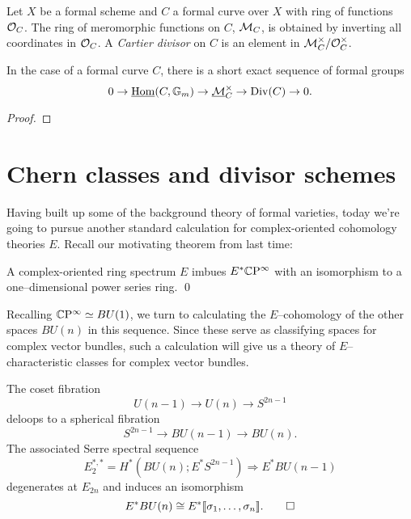 \begin{definition}
Let $X$ be a formal scheme and $C$ a formal curve over $X$ with ring of functions $\mathcal{O}_C$.  The ring of meromorphic functions on $C$, $\mathcal{M}_C$, is obtained by inverting all coordinates in $\mathcal{O}_C$.  A \textit{Cartier divisor} on $C$ is an element in $\mathcal{M}_C^\times / \mathcal{O}_C^\times$.
\end{definition}

\begin{lemma}
In the case of a formal curve $C$, there is a short exact sequence of formal groups \[0 \to \underline{\operatorname{Hom}}(C, \mathbb G_m) \to \underline{\mathcal{M}}_C^\times \to \operatorname{Div}(C) \to 0.\]
\end{lemma}
\begin{proof}
\end{proof}









\section{Chern classes and divisor schemes}

Having built up some of the background theory of formal varieties, today we're going to pursue another standard calculation for complex-oriented cohomology theories $E$.  Recall our motivating theorem from last time:
\begin{corollary}
A complex-oriented ring spectrum $E$ imbues $E^* \mathbb{C}\mathrm P^\infty$ with an isomorphism to a one--dimensional power series ring. \qed
\end{corollary}

\noindent Recalling $\mathbb{C}\mathrm P^\infty \simeq BU(1)$, we turn to calculating the $E$--cohomology of the other spaces $BU(n)$ in this sequence.  Since these serve as classifying spaces for complex vector bundles, such a calculation will give us a theory of $E$--characteristic classes for complex vector bundles.

\begin{lemma}\label{ECohomologyOfBUn}
The coset fibration \[U(n-1) \to U(n) \to S^{2n-1}\] deloops to a spherical fibration \[S^{2n-1} \to BU(n-1) \to BU(n).\]  The associated Serre spectral sequence \[E_2^{*, *} = H^*(BU(n); E^* S^{2n-1}) \Rightarrow E^* BU(n-1)\] degenerates at $E_{2n}$ and induces an isomorphism \[E^* BU(n) \cong E^* \llbracket \sigma_1, \ldots, \sigma_n\rrbracket. \qed\]
\end{lemma}

